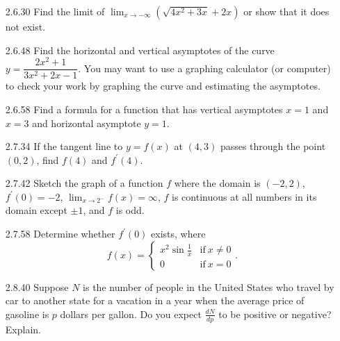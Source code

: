 \documentclass{article}
\begin{document}
\begin{enumerate}
    \vspace{6cm}

    \item[2.6.30]
        Find the limit of $\displaystyle \lim_{x \to -\infty} \left( \sqrt{4x^2+3x} + 2x\right)$ or show that it does not exist.

    \newpage

    \item[2.6.48]
        Find the horizontal and vertical asymptotes of the curve $y=\dfrac{2x^2+1}{3x^2+2x-1}$.
        You may want to use a graphing calculator (or computer) to check your work by
        graphing the curve and estimating the asymptotes.

    \vspace{8cm}

    \item[2.6.58]
        Find a formula for a function that has vertical asymptotes $x = 1$ and $x = 3$ and horizontal asymptote $y = 1$.

    \vspace{6cm}

    \item[2.7.34]
        If the tangent line to $y = f(x)$ at $(4, 3)$ passes through the point $(0, 2)$, find $f(4)$ and $f^{\prime}(4)$.

    \newpage

    \item[2.7.42]
        Sketch the graph of a function $f$ where the domain is $(-2, 2)$, $f^{\prime}(0)=-2$,
        $\displaystyle \lim_{x \to 2^-}f(x)=\infty$, $f$ is continuous at all numbers in its domain except $\pm 1$,
        and $f$ is odd.

    \vspace{6cm}

    \item[2.7.58]
        Determine whether $f^{\prime}(0)$ exists, where
        \begin{equation*}
            f(x) =
            \begin{cases}
                x^2 \sin{\frac{1}{x}} & \text{if} \ x \neq 0\\
                0 & \text{if} \ x=0
            \end{cases}.
        \end{equation*}

    \vspace{6cm}

    \item[2.8.40]
        Suppose $N$ is the number of people in the United States who travel by car to another state
        for a vacation in a year when the average price of gasoline is $p$ dollars per gallon.
        Do you expect $\frac{dN}{dp}$ to be positive or negative? Explain.


\end{enumerate}
\end{document}
